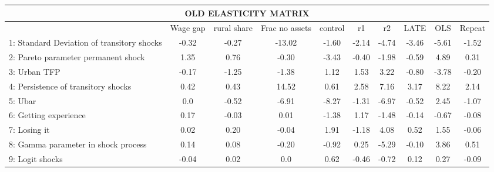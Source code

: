 \documentclass[pdftex,11pt]{article}
\renewcommand{\arraystretch}{.7}
\begin{document}
\begin{landscape}
\centering

\begin{table}
\footnotesize
\setlength {\tabcolsep}{1.5mm}
\renewcommand{\arraystretch}{2.25}
\begin{center}\label{tb:employment}
\begin{tabular}{l c c c c c c c c c}
\multicolumn{10}{c}{OLD ELASTICITY MATRIX} \\
\hline
\hline
&  Wage gap & rural share &  Frac no assets & control & r1 & r2 & LATE & OLS & Repeat \\
1: Standard Deviation of transitory shocks& -0.32   &  -0.27   &  -13.02  &  -1.60  &  -2.14 &  -4.74  &   -3.46  & -5.61 &   -1.52\\ 
2: Pareto parameter permanent shock       &  1.35   &   0.76   &   -0.30  &  -3.43  &  -0.40 &  -1.98  &   -0.59  &  4.89 &    0.31\\ 
3: Urban TFP                              & -0.17   &  -1.25   &   -1.38  &   1.12  &   1.53 &   3.22  &   -0.80  & -3.78 &   -0.20\\ 
4: Persistence of transitory shocks       &  0.42   &   0.43   &   14.52  &   0.61  &   2.58 &   7.16  &    3.17  &  8.22 &    2.14\\ 
5: Ubar                                   &  0.0    &  -0.52   &   -6.91  &  -8.27  &  -1.31 &  -6.97  &   -0.52  &  2.45 &   -1.07\\ 
6: Getting experience                     &  0.17   &  -0.03   &    0.01  &  -1.38  &   1.17 &  -1.48  &   -0.14  & -0.67 &   -0.08\\ 
7: Losing it                              &  0.02   &   0.20   &   -0.04  &   1.91  &  -1.18 &   4.08  &    0.52  &  1.55 &   -0.06\\ 
8: Gamma parameter in shock process       &  0.14   &   0.08   &   -0.20  &  -0.92  &   0.25 &  -5.29  &   -0.10  &  3.86 &    0.51\\ 
9: Logit shocks                           & -0.04   &   0.02   &    0.0   &   0.62  &  -0.46 &  -0.72  &    0.12  &  0.27 &   -0.09\\ 
\hline
\hline
\end{tabular}
\end{center}
\end{table}

\end{landscape}
\end{document}
